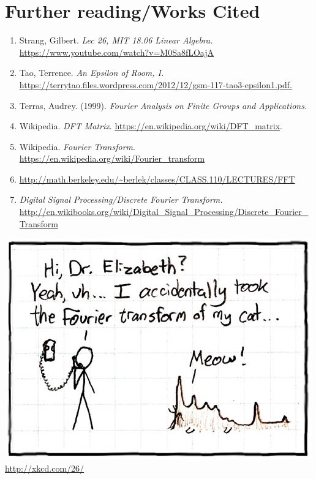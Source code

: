 \documentclass[11pt]{article}
\begin{document}
\section{Further reading/Works Cited}
\begin{enumerate}
\item Strang, Gilbert. \emph{Lec 26, MIT 18.06 Linear Algebra.} \url{https://www.youtube.com/watch?v=M0Sa8fLOajA}
\item Tao, Terrence. \emph{An Epsilon of Room, I.} \url{https://terrytao.files.wordpress.com/2012/12/gsm-117-tao3-epsilon1.pdf.}
\item Terras, Audrey. (1999). \emph{Fourier Analysis on Finite Groups and Applications.}
\item Wikipedia. \emph{DFT Matrix}. \url{https://en.wikipedia.org/wiki/DFT_matrix}.
\item Wikipedia. \emph{Fourier Transform}. \url{https://en.wikipedia.org/wiki/Fourier_transform}
\item \url{http://math.berkeley.edu/~berlek/classes/CLASS.110/LECTURES/FFT}
\item \emph{Digital Signal Processing/Discrete Fourier Transform.} \url{http://en.wikibooks.org/wiki/Digital_Signal_Processing/Discrete_Fourier_Transform}
\end{enumerate}
\vfill
  \centering
 \includegraphics[scale=3]{fourier.jpg}\\
 \url{http://xkcd.com/26/}
\end{document}
